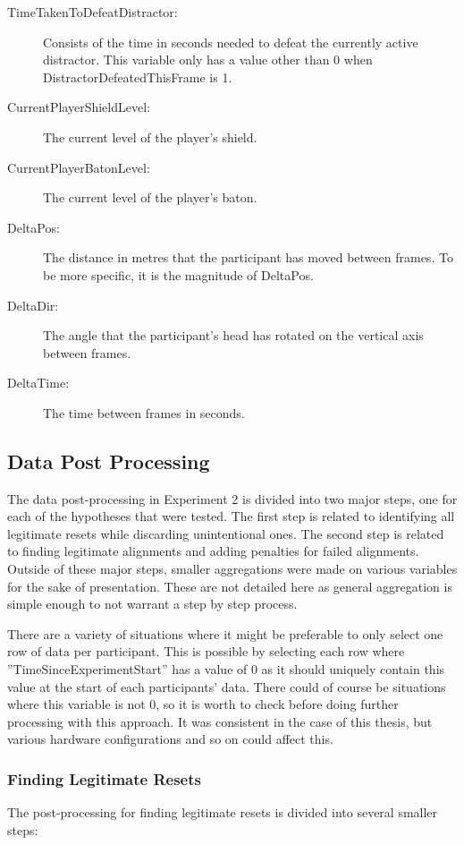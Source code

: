 \begin{description}
   \item[TimeTakenToDefeatDistractor:] Consists of the time in seconds needed to defeat the currently active distractor. This variable only has a value other than 0 when DistractorDefeatedThisFrame is 1. 
   \item[CurrentPlayerShieldLevel:] The current level of the player's shield. 
   \item[CurrentPlayerBatonLevel:] The current level of the player's baton. 
   \item[DeltaPos:] The distance in metres that the participant has moved between frames. To be more specific, it is the magnitude of DeltaPos. 
   \item[DeltaDir:] The angle that the participant's head has rotated on the vertical axis between frames.
   \item[DeltaTime:] The time between frames in seconds.
\end{description}


\subsection{Data Post Processing}\label{sec:ex2postprocessingdetails}
The data post-processing in Experiment 2 is divided into two major steps, one for each of the hypotheses that were tested. The first step is related to identifying all legitimate resets while discarding unintentional ones. The second step is related to finding legitimate alignments and adding penalties for failed alignments. Outside of these major steps, smaller aggregations were made on various variables for the sake of presentation. These are not detailed here as general aggregation is simple enough to not warrant a step by step process.
 
There are a variety of situations where it might be preferable to only select one row of data per participant. This is possible by selecting each row where ''TimeSinceExperimentStart'' has a value of 0 as it should uniquely contain this value at the start of each participants' data. There could of course be situations where this variable is not 0, so it is worth to check before doing further processing with this approach. It was consistent in the case of this thesis, but various hardware configurations and so on could affect this.

\subsubsection{Finding Legitimate Resets}
The post-processing for finding legitimate resets is divided into several smaller steps:

